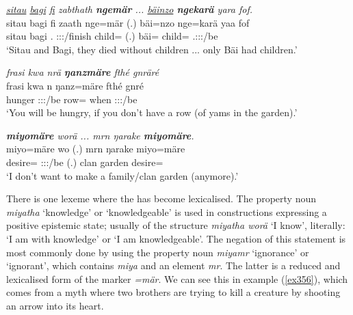 \begin{exe}
	\ex \emph{\underline{sitau} \underline{bagi} \underline{fi} zabthath \textbf{ngemär} ... \underline{bäinzo} \textbf{ngekarä} yara fof.}\\
	\gll sitau bagi fi zaath nge=mär (.) bäi=nzo nge=karä yaa fof\\
	sitau bagi \Third.{\Abs} \Stpl:\Sbj:\Pst:\Pfv/finish child={\Priv} (.) bäi={\Only} child={\Prop} \Tsg.\Masc:\Sbj:\Pst:\Ipfv/be \Emph\\ 
	\trans `Sitau and Bagi, they died without children ... only Bäi had children.'\\
	\label{ex353}
\end{exe}
\begin{exe}
	\ex \emph{frasi kwa nrä \textbf{ŋanzmäre} fthé gnräré}\\
	\gll frasi kwa n ŋanz=märe fthé gnré\\
	hunger {\Fut} \Ssg:\Sbj:\Nonpast:\Ipfv/be row={\Priv} when \Ssg:\Sbj:\Imp:\Ipfv/be\\
	\trans `You will be hungry, if you don't have a row (of yams in the garden).'\\
	\label{ex354}
\end{exe}
\begin{exe}
	\ex \emph{\textbf{miyomäre} worä ... mrn ŋarake \textbf{miyomäre}.}\\
	\gll miyo=märe wo (.) mrn ŋarake miyo=märe\\
	desire={\Priv} \Fsg:\Sbj:\Nonpast:\Ipfv/be (.) clan garden desire={\Priv}\\
	\trans `I don't want to make a family/clan garden (anymore).'
	\label{ex355}
\end{exe}

There is one lexeme where the   has become lexicalised. The property noun \emph{miyatha} `knowledge' or `knowledgeable' is used in constructions expressing a positive epistemic state; usually of the structure \emph{miyatha worä} `I know', literally: `I am with knowledge' or `I am knowledgeable'. The negation of this statement is most commonly done by using the property noun \emph{miyamr} `ignorance' or `ignorant', which contains \emph{miya} and an element \emph{mr}. The latter is a reduced and lexicalised form of the   marker \emph{=mär}. We can see this in example (\ref{ex356}), which comes from a myth where two brothers are trying to kill a creature by shooting an arrow into its heart.
	 
